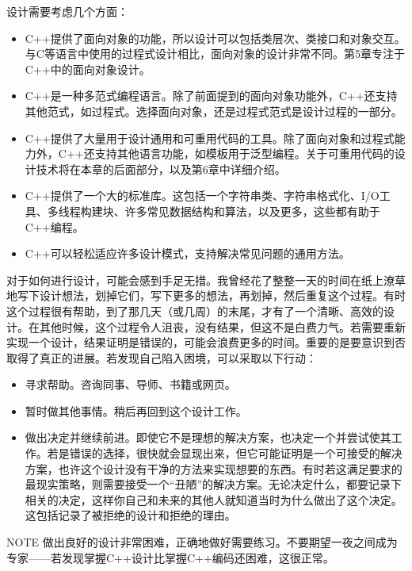 
设计需要考虑几个方面：

\begin{itemize}
\item
C++提供了面向对象的功能，所以设计可以包括类层次、类接口和对象交互。与C等语言中使用的过程式设计相比，面向对象的设计非常不同。第5章专注于C++中的面向对象设计。

\item
C++是一种多范式编程语言。除了前面提到的面向对象功能外，C++还支持其他范式，如过程式。选择面向对象，还是过程式范式是设计过程的一部分。

\item
C++提供了大量用于设计通用和可重用代码的工具。除了面向对象和过程式能力外，C++还支持其他语言功能，如模板用于泛型编程。关于可重用代码的设计技术将在本章的后面部分，以及第6章中详细介绍。

\item
C++提供了一个大的标准库。这包括一个字符串类、字符串格式化、I/O工具、多线程构建块、许多常见数据结构和算法，以及更多，这些都有助于C++编程。

\item
C++可以轻松适应许多设计模式，支持解决常见问题的通用方法。
\end{itemize}

对于如何进行设计，可能会感到手足无措。我曾经花了整整一天的时间在纸上潦草地写下设计想法，划掉它们，写下更多的想法，再划掉，然后重复这个过程。有时这个过程很有帮助，到了那几天（或几周）的末尾，才有了一个清晰、高效的设计。在其他时候，这个过程令人沮丧，没有结果，但这不是白费力气。若需要重新实现一个设计，结果证明是错误的，可能会浪费更多的时间。重要的是要意识到否取得了真正的进展。若发现自己陷入困境，可以采取以下行动：

\begin{itemize}
\item
寻求帮助。咨询同事、导师、书籍或网页。

\item
暂时做其他事情。稍后再回到这个设计工作。

\item
做出决定并继续前进。即使它不是理想的解决方案，也决定一个并尝试使其工作。若是错误的选择，很快就会显现出来，但它可能证明是一个可接受的解决方案，也许这个设计没有干净的方法来实现想要的东西。有时若这满足要求的最现实策略，则需要接受一个“丑陋”的解决方案。无论决定什么，都要记录下相关的决定，这样你自己和未来的其他人就知道当时为什么做出了这个决定。这包括记录了被拒绝的设计和拒绝的理由。
\end{itemize}

\begin{myNotic}{NOTE}
做出良好的设计非常困难，正确地做好需要练习。不要期望一夜之间成为专家——若发现掌握C++设计比掌握C++编码还困难，这很正常。
\end{myNotic}











